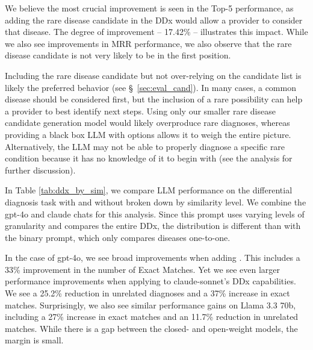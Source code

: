 We believe the most crucial improvement is seen in the Top-5 performance, as adding the rare disease candidate in the DDx would allow a provider to consider that disease.  The degree of improvement -- 17.42\% -- illustrates this impact. While we also see improvements in MRR performance, we also observe that the rare disease candidate is not very likely to be in the first position.  

Including the rare disease candidate but not over-relying on the candidate list is likely the preferred behavior (see \S~\ref{sec:eval_cand}).  In many cases, a common disease should be considered first, but the inclusion of a rare possibility can help a provider to best identify next steps.  Using only our smaller rare disease candidate generation model would likely overproduce rare diagnoses, whereas providing a black box LLM with options allows it to weigh the entire picture.  Alternatively, the LLM may not be able to properly diagnose a specific rare condition because it has no knowledge of it to begin with (see the analysis for further discussion).

In Table \ref{tab:ddx_by_sim}, we compare LLM performance on the differential diagnosis task with and without \methodname broken down by similarity level. We combine the gpt-4o and claude chats for this analysis. Since this prompt uses varying levels of granularity and compares the entire DDx, the distribution is different than with the binary prompt, which only compares diseases one-to-one. 

In the case of gpt-4o, we see broad improvements when adding \methodname.  This includes a 33\% improvement in the number of Exact Matches.  Yet we see even larger performance improvements when applying \methodname to claude-sonnet's DDx capabilities.  We see a 25.2\% reduction in unrelated diagnoses and a 37\% increase in exact matches.  Surprisingly, we also see similar performance gains on Llama 3.3 70b, including a 27\% increase in exact matches and an 11.7\% reduction in unrelated matches. While there is a gap between the closed- and open-weight models, the margin is small.

